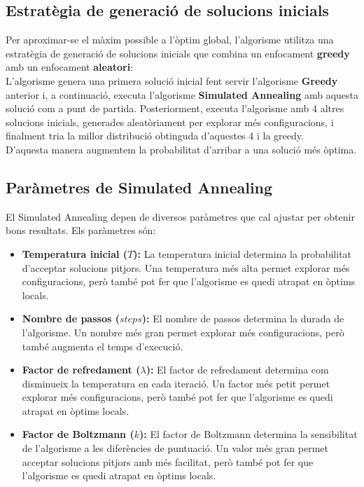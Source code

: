 \documentclass[a4paper,12pt]{report}
\begin{document}
\newpage

\subsection{Estratègia de generació de solucions inicials}
Per aproximar-se el màxim possible a l'òptim global, l'algorisme utilitza una estratègia de generació de solucions inicials que combina un enfocament \textbf{greedy} amb un enfocament \textbf{aleatori}:\\
L'algorisme genera una primera solució inicial fent servir l'algorisme \textbf{Greedy} anterior i, a continuació, executa l'algorisme \textbf{Simulated Annealing} amb aquesta solució com a punt de partida.
Posteriorment, executa l'algorisme amb 4 altres solucions inicials, generades aleatòriament per explorar més configuracions, i finalment tria la millor distribució obtinguda d'aquestes 4 i la greedy.\\
D'aquesta manera augmentem la probabilitat d'arribar a una solució més òptima.

\subsection{Paràmetres de Simulated Annealing}

El Simulated Annealing depen de diversos paràmetres que cal ajustar per obtenir bons resultats. Els paràmetres són:

\begin{itemize}
	\item \textbf{Temperatura inicial (\(T\)):} La temperatura inicial determina la probabilitat d'acceptar solucions pitjors. Una temperatura més alta permet explorar més configuracions, però també pot fer que l'algorisme es quedi atrapat en òptims locals. 
	\item \textbf{Nombre de passos (\(steps\)):} El nombre de passos determina la durada de l'algorisme. Un nombre més gran permet explorar més configuracions, però també augmenta el temps d'execució. 
	\item \textbf{Factor de refredament (\(\lambda\)):} El factor de refredament determina com disminueix la temperatura en cada iteració. Un factor més petit permet explorar més configuracions, però també pot fer que l'algorisme es quedi atrapat en òptims locals. 
	\item \textbf{Factor de Boltzmann (\(k\)):} El factor de Boltzmann determina la sensibilitat de l'algorisme a les diferències de puntuació. Un valor més gran permet acceptar solucions pitjors amb més facilitat, però també pot fer que l'algorisme es quedi atrapat en òptims locals. 
\end{itemize}
\end{document}
